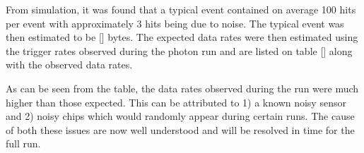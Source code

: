 From simulation, it was found that a typical event contained on average 100
hits per event with approximately 3 hits being due to noise.  The typical 
event was then estimated to be [] bytes.  The expected data rates
were then estimated using the trigger rates observed during the photon
run and are listed on table [] along with the observed data rates.  
\begin{table}
    \caption{Occupancy, event size and resulting data rate expected for each of the three 
             converter thicknesses used in the test run.}
    \label{table:sim_rates}
\end{table}

\begin{table}
    \caption{Occupancy, event size and resulting data rate observed for each of the three 
             converter thicknesses used in the test run.}
    \label{table:observed_rates}
\end{table}    

As can be seen from the table, the data rates observed during the run were
much higher than those expected.  This can be attributed to 1) a known
noisy sensor and 2) noisy chips which would randomly appear during certain
runs.  The cause of both these issues are now well understood and will be
resolved in time for the full run.

